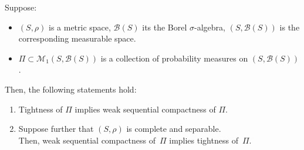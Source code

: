 \begin{theorem}
\label{ProkhorovTheorem}
\mbox{}\vskip 0.2cm
\noindent
Suppose:
\begin{itemize}
\item	$\left(S,\rho\right)$ is a metric space, $\mathcal{B}(S)$ its the Borel $\sigma$-algebra,
		$\left(S,\mathcal{B}(S)\right)$ is the corresponding measurable space.
\item	$\Pi \subset \mathcal{M}_{1}\!\left(S,\mathcal{B}(S)\right)$
		is a collection of probability measures on $\left(S,\mathcal{B}(S)\right)$.
\end{itemize}
Then, the following statements hold:
\begin{enumerate}
\item	Tightness of \;$\Pi$ implies weak sequential compactness of \;$\Pi$.
\item	Suppose further that $\left(S,\rho\right)$ is complete and separable.\\
		Then, weak sequential compactness of \,$\Pi$ implies tightness of \,$\Pi$.
\end{enumerate}
\end{theorem}

